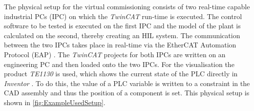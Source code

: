     	The physical setup for the virtual commissioning consists of two real-time capable industrial PCs (IPC) on which the \textit{TwinCAT} run-time is executed. The control software to be tested is executed on the first IPC and the model of the plant is calculated on the second, thereby creating an HIL system. The communication between the two IPCs takes place in real-time via the EtherCAT Automation Protocol (EAP) \cite{TwincatEAP}. The \textit{TwinCAT} projects for both IPCs are written on an engineering PC and then loaded onto the two IPCs.
\ifundef{\WithVisualization} {}
{       \color{brown}
        For the visualisation the product \textit{TE1130} is used, which shows the current state of the PLC directly in \textit{Inventor} \cite{BeckhoffCadProduct}. To do this, the value of a PLC variable is written to a constraint in the CAD assembly and thus the position of a component is set.
        \color{black}
}
    	This physical setup is shown in \autoref{fig:ExampleUsedSetup}. 
